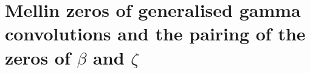 \chapter{Mellin zeros of generalised gamma convolutions and the pairing of the zeros of \texorpdfstring{$\beta$}{beta} and \texorpdfstring{$\zeta$}{zeta}}\label{vol3:ch18}

